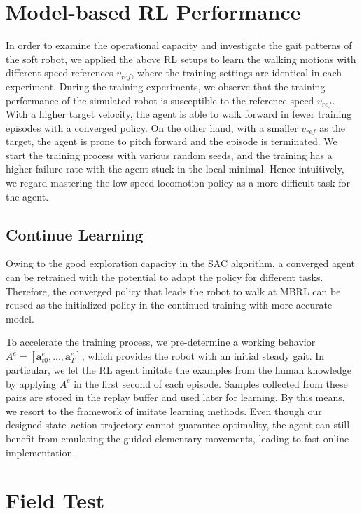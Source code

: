 \section{Model-based RL Performance}

In order to examine the operational capacity and investigate the gait patterns of the soft robot, we applied the above RL setups to learn the walking motions with different speed references $v_{ref}$, where the training settings are identical in each experiment. During the training experiments, we observe that the training performance of the simulated robot is susceptible to the reference speed $v_{ref}$. With a higher target velocity, the agent is able to walk forward in fewer training episodes with a converged policy. On the other hand, with a smaller $v_{ref}$ as the target, the agent is prone to pitch forward and the episode is terminated. We start the training process with various random seeds, and the training has a higher failure rate with the agent stuck in the local minimal. Hence intuitively, we regard mastering the low-speed locomotion policy as a more difficult task for the agent.


\subsection{Continue Learning}
Owing to the good exploration capacity in the SAC algorithm, a converged agent can be retrained with the potential to adapt the policy for different tasks. Therefore, the converged policy that leads the robot to walk at MBRL can be reused as the initialized policy in the continued training with more accurate model.

To accelerate the training process, we pre-determine a working behavior $A^e = [\textbf{a}_{t0}^e, ..., \textbf{a}_T^e]$, which provides the robot with an initial steady gait. In particular, we let the RL agent imitate the examples from the human knowledge by applying $A^e$ in the first second of each episode. Samples collected from these pairs are stored in the replay buffer and used later for learning. By this means, we resort to the framework of imitate learning methods. Even though our designed state–action trajectory cannot guarantee optimality, the agent can still benefit from emulating the guided elementary movements, leading to fast online implementation. 


\section{Field Test}
